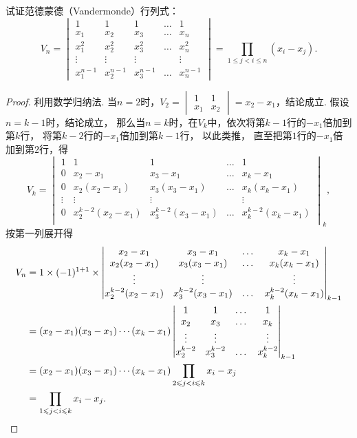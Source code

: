 \begin{example}
试证范德蒙德（Vandermonde）行列式：
\begin{equation}\label{equation:行列式.范德蒙德行列式}
V_n = \begin{vmatrix}
1 & 1 & 1 & \dots & 1 \\
x_1 & x_2 & x_3 & \dots & x_n \\
x_1^2 & x_2^2 & x_3^2 & \dots & x_n^2 \\
\vdots & \vdots & \vdots& & \vdots \\
x_1^{n-1} & x_2^{n-1} & x_3^{n-1} & \dots & x_n^{n-1}
\end{vmatrix}=\prod\limits_{1 \leqslant j < i \leqslant n}{(x_i-x_j)}.
\end{equation}
\begin{proof}
利用数学归纳法.
当\(n=2\)时，\(V_2 = \begin{vmatrix}
	1 & 1 \\ x_1 & x_2
\end{vmatrix} = x_2 - x_1\)，结论成立.
假设\(n=k-1\)时，结论成立，%
那么当\(n=k\)时，在\(V_k\)中，依次将第\(k-1\)行的\(-x_1\)倍加到第\(k\)行，%
将第\(k-2\)行的\(-x_1\)倍加到第\(k-1\)行，%
以此类推，%
直至把第\(1\)行的\(-x_1\)倍加到第\(2\)行，得\[
V_k = \begin{vmatrix}
1 & 1 & 1 & \dots & 1 \\
0 & x_2 - x_1 & x_3 - x_1 & \dots & x_k - x_1 \\
0 & x_2(x_2 - x_1) & x_3(x_3 - x_1) & \dots & x_k(x_k - x_1) \\
\vdots & \vdots & \vdots & & \vdots \\
0 & x_2^{k-2}(x_2 - x_1) & x_3^{k-2}(x_3 - x_1) & \dots & x_k^{k-2}(x_k - x_1) \\
\end{vmatrix}_k,
\]按第一列展开得\begin{align*}
V_n &= 1 \times (-1)^{1+1} \times \begin{vmatrix}
x_2 - x_1 & x_3 - x_1 & \dots & x_k - x_1 \\
x_2(x_2 - x_1) & x_3(x_3 - x_1) & \dots & x_k(x_k - x_1) \\
\vdots & \vdots & & \vdots \\
x_2^{k-2}(x_2 - x_1) & x_3^{k-2}(x_3 - x_1) & \dots & x_k^{k-2}(x_k - x_1) \\
\end{vmatrix}_{k-1} \\
&= (x_2 - x_1)(x_3 - x_1)\dotsm(x_k - x_1) \begin{vmatrix}
1 & 1 & \dots & 1 \\
x_2 & x_3 & \dots & x_k \\
\vdots & \vdots & & \vdots \\
x_2^{k-2} & x_3^{k-2} & \dots & x_k^{k-2} \\
\end{vmatrix}_{k-1} \\
&= (x_2 - x_1)(x_3 - x_1)\dotsm(x_k - x_1) \prod\limits_{2 \leqslant j < i \leqslant k}{x_i - x_j} \\
&= \prod\limits_{1 \leqslant j < i \leqslant k}{x_i - x_j}.
\qedhere
\end{align*}
\end{proof}
\end{example}

